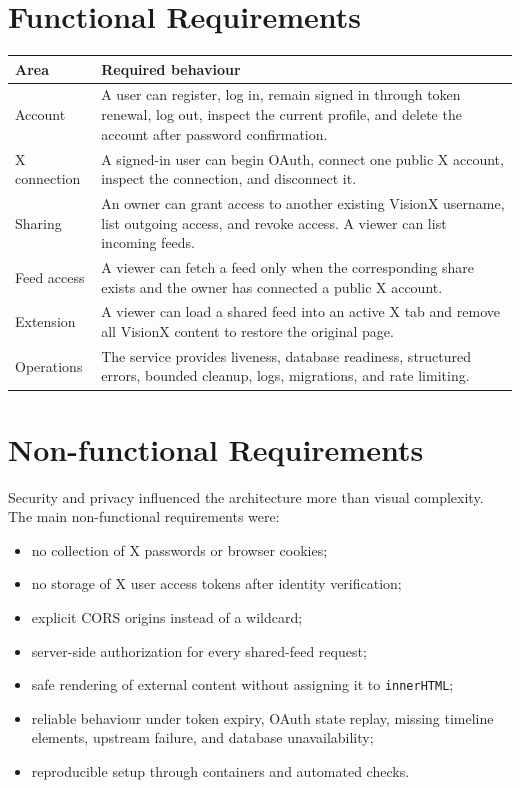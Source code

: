 \documentclass[11pt,a4paper]{report}
\newcommand{\code}[1]{\texttt{#1}}
\begin{document}
\section{Functional Requirements}
\begin{longtable}{L{0.23\textwidth} L{0.69\textwidth}}
\toprule
\textbf{Area} & \textbf{Required behaviour} \\
\midrule
\endhead
Account & A user can register, log in, remain signed in through token renewal,
log out, inspect the current profile, and delete the account after password
confirmation. \\
X connection & A signed-in user can begin OAuth, connect one public X account,
inspect the connection, and disconnect it. \\
Sharing & An owner can grant access to another existing VisionX username, list
outgoing access, and revoke access. A viewer can list incoming feeds. \\
Feed access & A viewer can fetch a feed only when the corresponding share
exists and the owner has connected a public X account. \\
Extension & A viewer can load a shared feed into an active X tab and remove all
VisionX content to restore the original page. \\
Operations & The service provides liveness, database readiness, structured
errors, bounded cleanup, logs, migrations, and rate limiting. \\
\bottomrule
\end{longtable}

\section{Non-functional Requirements}
Security and privacy influenced the architecture more than visual complexity.
The main non-functional requirements were:

\begin{itemize}
  \item no collection of X passwords or browser cookies;
  \item no storage of X user access tokens after identity verification;
  \item explicit CORS origins instead of a wildcard;
  \item server-side authorization for every shared-feed request;
  \item safe rendering of external content without assigning it to
  \code{innerHTML};
  \item reliable behaviour under token expiry, OAuth state replay, missing
  timeline elements, upstream failure, and database unavailability;
  \item reproducible setup through containers and automated checks.
\end{itemize}
\end{document}
